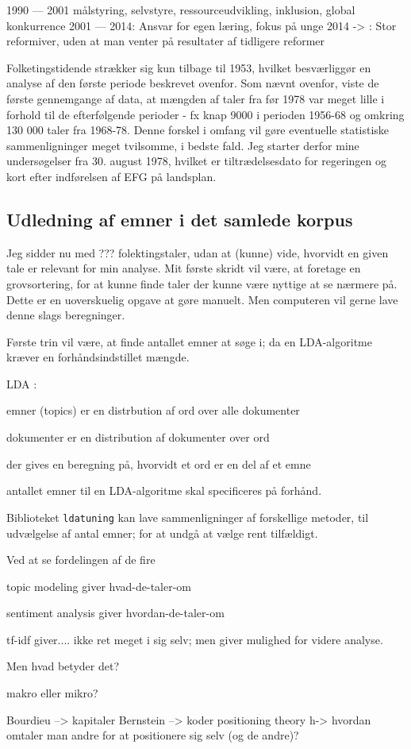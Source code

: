 1990 --- 2001 målstyring, selvstyre, ressourceudvikling, inklusion, global konkurrence 
2001 — 2014: Ansvar for egen læring, fokus på unge
2014 -> : Stor reformiver, uden at man venter på resultater af tidligere reformer

Folketingstidende strækker sig kun tilbage til 1953, hvilket besværliggør en analyse af den første periode beskrevet ovenfor.
Som nævnt ovenfor, viste de første gennemgange af data, at mængden af taler fra før 1978 var meget lille i forhold til de efterfølgende perioder - fx knap 9000 i perioden 1956-68 og omkring 130 000 taler fra 1968-78.
Denne forskel i omfang vil gøre eventuelle statistiske sammenligninger meget tvilsomme, i bedste fald.
Jeg starter derfor mine undersøgelser fra 30. august 1978, hvilket er tiltrædelsesdato for regeringen og kort efter indførelsen af EFG på landsplan.

\subsection{Udledning af emner i det samlede korpus}

Jeg sidder nu med ??? folektingstaler, udan at (kunne) vide, hvorvidt en given tale er relevant for min analyse.
Mit første skridt vil være, at foretage en grovsortering, for at kunne finde taler der kunne være nyttige at se nærmere på.
Dette er en uoverskuelig opgave at gøre manuelt.
Men computeren vil gerne lave denne slags beregninger.

Første trin vil være, at finde antallet emner at søge i; da en LDA-algoritme kræver en forhåndsindstillet mængde.

LDA \autocite{grunTopicmodelsPackageFitting2011}: 

emner (topics) er en distrbution af ord over alle dokumenter

dokumenter er en distribution af dokumenter over ord

der gives en beregning på, hvorvidt et ord er en del af et emne

antallet emner til en LDA-algoritme skal specificeres på forhånd.

Biblioteket \texttt{ldatuning} kan lave sammenligninger af forskellige metoder, til udvælgelse af antal emner; for at undgå at vælge rent tilfældigt.


Ved at se fordelingen af de fire

topic modeling giver hvad-de-taler-om

sentiment analysis giver hvordan-de-taler-om

tf-idf giver.... ikke ret meget i sig selv; men giver mulighed for videre analyse.

Men hvad betyder det?

makro eller mikro?

Bourdieu --> kapitaler
Bernstein --> koder
positioning theory h-> hvordan omtaler man andre for at positionere sig selv (og de andre)?
